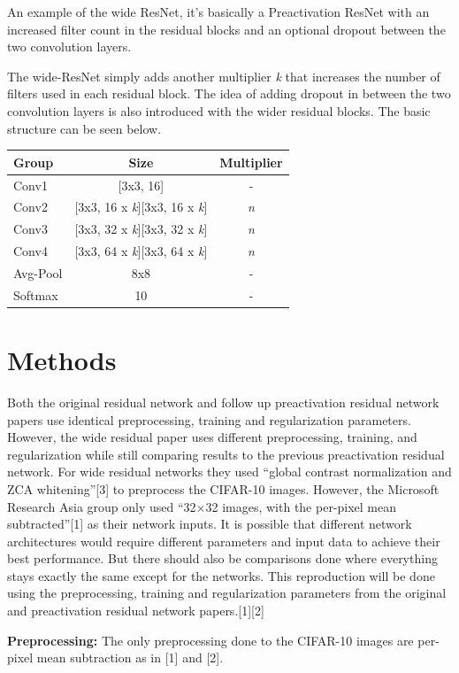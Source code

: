 \documentclass[10pt,a4paper,onecolumn]{article}
\begin{document}
An example of the wide ResNet, it's basically a Preactivation ResNet
with an increased filter count in the residual blocks and an optional
dropout between the two convolution layers.

The wide-ResNet simply adds another multiplier \emph{k} that increases
the number of filters used in each residual block. The idea of adding
dropout in between the two convolution layers is also introduced with
the wider residual blocks. The basic structure can be seen below.

\begin{longtable}[c]{@{}lcc@{}}
\toprule
Group & Size & Multiplier\tabularnewline
\midrule
\endhead
Conv1 & {[}3x3, 16{]} & -\tabularnewline
Conv2 & {[}3x3, 16 x \emph{k}{]}{[}3x3, 16 x \emph{k}{]} &
\emph{n}\tabularnewline
Conv3 & {[}3x3, 32 x \emph{k}{]}{[}3x3, 32 x \emph{k}{]} &
\emph{n}\tabularnewline
Conv4 & {[}3x3, 64 x \emph{k}{]}{[}3x3, 64 x \emph{k}{]} &
\emph{n}\tabularnewline
Avg-Pool & 8x8 & -\tabularnewline
Softmax & 10 & -\tabularnewline
\bottomrule
\end{longtable}

\section{Methods}\label{methods}

Both the original residual network and follow up preactivation residual
network papers use identical preprocessing, training and regularization
parameters. However, the wide residual paper uses different
preprocessing, training, and regularization while still comparing
results to the previous preactivation residual network. For wide
residual networks they used ``global contrast normalization and ZCA
whitening''{[}3{]} to preprocess the CIFAR-10 images. However, the
Microsoft Research Asia group only used ``32×32 images, with the
per-pixel mean subtracted''{[}1{]} as their network inputs. It is
possible that different network architectures would require different
parameters and input data to achieve their best performance. But there
should also be comparisons done where everything stays exactly the same
except for the networks. This reproduction will be done using the
preprocessing, training and regularization parameters from the original
and preactivation residual network papers.{[}1{]}{[}2{]}

\textbf{Preprocessing:} The only preprocessing done to the CIFAR-10
images are per-pixel mean subtraction as in {[}1{]} and {[}2{]}.
\end{document}
